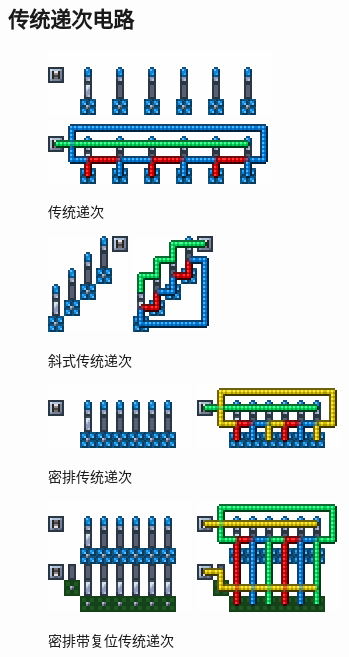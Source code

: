 \subsection{传统递次电路}\label{sec2}
\mbox{}
\begin{figure}[!ht]
    \centering
    \includegraphics{images/72.png}
    \qquad
    \includegraphics{images/73.png}
    \caption{传统递次}
\end{figure}
\begin{figure}[!ht]
    \centering
    \includegraphics{images/78.png}
    \qquad
    \includegraphics{images/79.png}
    \caption{斜式传统递次}
\end{figure}
\begin{figure}[!ht]
    \centering
    \includegraphics{images/82.png}
    \qquad
    \includegraphics{images/83.png}
    \caption{密排传统递次}
\end{figure}
\begin{figure}[!ht]
    \centering
    \includegraphics{images/317.png}
    \qquad
    \includegraphics{images/318.png}
    \caption{密排带复位传统递次}
\end{figure}
